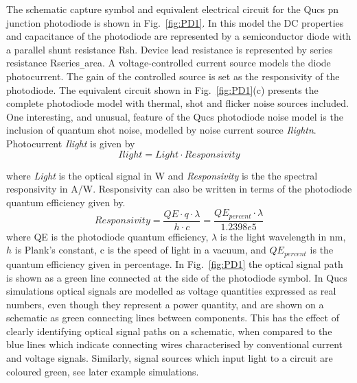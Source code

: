 The schematic capture symbol and equivalent electrical circuit for the
Qucs pn junction photodiode is shown in Fig.~\ref{fig:PD1}. In this
model the DC properties and capacitance of the photodiode are
represented by a semiconductor diode with a parallel shunt resistance
Rsh. Device lead resistance is represented by series resistance
Rseries\verb|_|area. A voltage-controlled current source models the
diode photocurrent. The gain of the controlled source is set as the
responsivity of the photodiode. The equivalent circuit shown in
Fig.~\ref{fig:PD1}(c) presents the complete photodiode model with
thermal, shot and flicker noise sources included. One interesting, and
unusual, feature of the Qucs photodiode noise model is the inclusion
of quantum shot noise, modelled by noise current source
\textit{Ilightn}. Photocurrent \textit{Ilight} is given by
\begin{equation}
 Ilight = Light \cdot Responsivity
\end{equation} 
    

where \textit{Light} is the optical signal in W and
\textit{Responsivity} is the the spectral responsivity in
A/W. Responsivity can also be written in terms of the photodiode
quantum efficiency given by.
\begin{equation}
 Responsivity = \dfrac{QE \cdot q \cdot \lambda}{h \cdot c} = \dfrac{QE_{percent} \cdot \lambda}{1.2398e5}
\end{equation}
where QE is the photodiode quantum efficiency, $\lambda$ is the light
wavelength in nm, $h$ is Plank's constant, c is the speed of light in
a vacuum, and $QE_{percent}$ is the quantum efficiency given in
percentage. In Fig.~\ref{fig:PD1} the optical signal path is shown as
a green line connected at the side of the photodiode symbol. In Qucs
simulations optical signals are modelled as voltage quantities
expressed as real numbers, even though they represent a power
quantity, and are shown on a schematic as green connecting lines
between components. This has the effect of clearly identifying optical
signal paths on a schematic, when compared to the blue lines which
indicate connecting wires characterised by conventional current and
voltage signals. Similarly, signal sources which input light to a
circuit are coloured green, see later example simulations.

